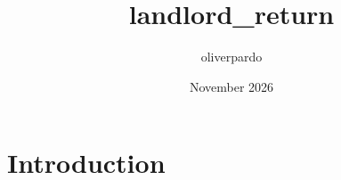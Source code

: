 \documentclass{article}
\title{landlord_return}
\author{oliverpardo }
\date{November 2026}
\begin{document}
\maketitle

\section{Introduction}
\end{document}
